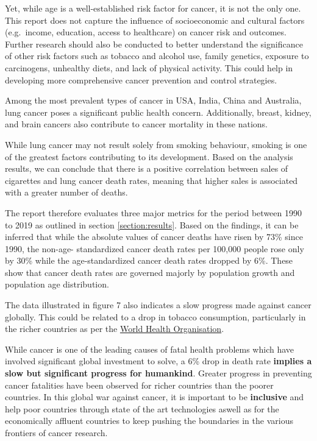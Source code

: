 \documentclass[11pt,a4paper,]{article}
\begin{document}
Yet, while age is a well-established risk factor for cancer, it is not the only one. This report does not capture the influence of socioeconomic and cultural factors (e.g.~income, education, access to healthcare) on cancer risk and outcomes. Further research should also be conducted to better understand the significance of other risk factors such as tobacco and alcohol use, family genetics, exposure to carcinogens, unhealthy diets, and lack of physical activity. This could help in developing more comprehensive cancer prevention and control strategies.

Among the most prevalent types of cancer in USA, India, China and Australia, lung cancer poses a significant public health concern. Additionally, breast, kidney, and brain cancers also contribute to cancer mortality in these nations.

While lung cancer may not result solely from smoking behaviour, smoking is one of the greatest factors contributing to its development. Based on the analysis results, we can conclude that there is a positive correlation between sales of cigarettes and lung cancer death rates, meaning that higher sales is associated with a greater number of deaths.

The report therefore evaluates three major metrics for the period between 1990 to 2019 as outlined in section \ref{section:results}. Based on the findings, it can be inferred that while the absolute values of cancer deaths have risen by 73\% since 1990, the non-age- standardized cancer death rates per 100,000 people rose only by 30\% while the age-standardized cancer death rates dropped by 6\%. These show that cancer death rates are governed majorly by population growth and population age distribution.

The data illustrated in figure 7 also indicates a slow progress made against cancer globally. This could be related to a drop in tobacco consumption, particularly in the richer countries as per the \href{https://www.who.int/news/item/16-11-2021-tobacco-use-falling-who-urges-countries-to-invest-in-helping-more-people-to-quit-tobacco}{World Health Organisation}.

While cancer is one of the leading causes of fatal health problems which have involved significant global investment to solve, a 6\% drop in death rate \textbf{implies a slow but significant progress for humankind}. Greater progress in preventing cancer fatalities have been observed for richer countries than the poorer countries. In this global war against cancer, it is important to be \textbf{inclusive} and help poor countries through state of the art technologies aswell as for the economically affluent countries to keep pushing the boundaries in the various frontiers of cancer research.
\end{document}
